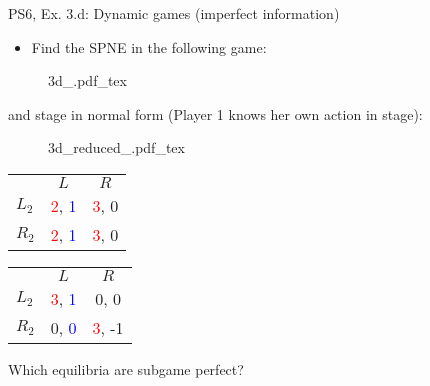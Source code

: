 \begin{frame}{PS6, Ex. 3.d: Dynamic games (imperfect information)}
    \begin{itemize}
      \item[(d)] Find the SPNE in the following game:
    \end{itemize}
    \vspace{-4pt}
    \begin{figure}[!h]
      \center
      \def\svgwidth{.8\columnwidth}
      {3d_.pdf_tex}
    \end{figure}
    \vspace{-4pt}
     and  stage in normal form (Player 1 knows her own action in  stage):
    \vspace{-4pt}
    \begin{figure}[!h]
      \center
      \def\svgwidth{.25\columnwidth}
      {3d_reduced_.pdf_tex}
    \end{figure}
    \vspace{-9pt}
    \begin{table}
      \begin{tabular}{l|c|c|}
        \multicolumn{1}{c}{} & \multicolumn{1}{c}{\color{blue}$L$} & \multicolumn{1}{c}{$R$} \\\cline{2-3}
        $L_2$ & \textcolor{red}{2}, \textcolor{blue}{1} & \textcolor{red}{3}, 0 \\\cline{2-3}
        $R_2$ & \textcolor{red}{2}, \textcolor{blue}{1} & \textcolor{red}{3}, 0 \\\cline{2-3}
      \end{tabular}
      \enskip
      \begin{tabular}{l|c|c|}
        \multicolumn{1}{c}{} & \multicolumn{1}{c}{\color{blue}$L$} & \multicolumn{1}{c}{$R$} \\\cline{2-3}
        $L_2$ & \textcolor{red}{3}, \textcolor{blue}{1} & 0, 0 \\\cline{2-3}
        $R_2$ & 0, \textcolor{blue}{0} & \textcolor{red}{3}, -1 \\\cline{2-3}
      \end{tabular}
    \end{table}
    Which equilibria are subgame perfect?
    \vfill\null
\end{frame}
